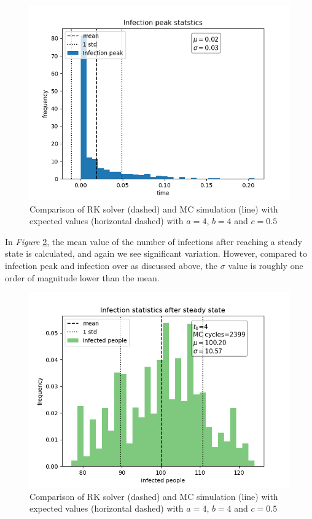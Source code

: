 \begin{figure}[!h]
    \centering
    \includegraphics[scale=0.55]{plots/MC_solver_multiple_a_4_b_4_c_0.5500Peak_I500.png}
    \caption{Comparison of RK solver (dashed) and MC simulation (line) with expected values (horizontal dashed) with $a=4$, $b=4$ and $c=0.5$}
    \label{fig:error_Ipeak}
\end{figure}

In \textit{Figure} \ref{fig:error_meanI}, the mean value of the number of infections after reaching a steady state is calculated, and again we see significant variation. 
However, compared to infection peak and infection over as discussed above, the $\sigma$ value is roughly one order of magnitude lower than the mean. 

\begin{figure}[!h]
    \centering
    \includegraphics[scale=0.55]{plots/MC_solver_error_a_4_b_1_c_0.5I_SS_mcs_2399.png}
    \caption{Comparison of RK solver (dashed) and MC simulation (line) with expected values (horizontal dashed) with $a=4$, $b=4$ and $c=0.5$}
    \label{fig:error_meanI}
\end{figure}

